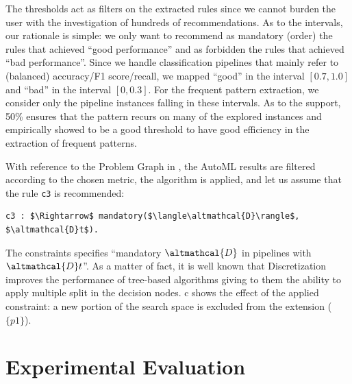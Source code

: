 The thresholds act as filters on the extracted rules since we cannot burden the user with the investigation of hundreds of recommendations. 
As to the intervals, our rationale is simple: we only want to recommend as mandatory (order) the rules that achieved ``good performance'' and as forbidden the rules that achieved ``bad performance''.
Since we handle classification pipelines that mainly refer to (balanced) accuracy/F1 score/recall, we mapped ``good'' in the interval $[0.7, 1.0]$ and ``bad'' in the interval $[0, 0.3]$. For the frequent pattern extraction, we consider only the pipeline instances falling in these intervals.
As to the support, 50\% ensures that the pattern recurs on many of the explored instances and empirically showed to be a good threshold to have good efficiency in the extraction of frequent patterns.

\begin{example}
With reference to the Problem Graph in ,
the AutoML results are filtered according to the chosen metric, the algorithm \cite{raschkas_2018_mlxtend} is applied, and let us assume that the rule \texttt{c3} is recommended:
\begin{lstlisting}[mathescape=true]
c3 : $\Rightarrow$ mandatory($\langle\altmathcal{D}\rangle$, $\altmathcal{D}t$).
\end{lstlisting}
The constraints specifies ``mandatory $\altmathcal{D}$ in pipelines with $\altmathcal{D}t$''.
As a matter of fact, it is well known that Discretization improves the performance of tree-based algorithms giving to them the ability to apply multiple split in the decision nodes.
c shows the effect of the applied constraint: a new portion of the search space is excluded from the extension ($\{p1\}$).
\end{example}


\section{Experimental Evaluation}\label{hamlet-sec:test}

